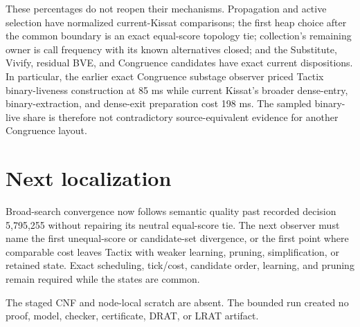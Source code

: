 \documentclass[11pt]{article}
\begin{document}
These percentages do not reopen their mechanisms.  Propagation and active
selection have normalized current-Kissat comparisons; the first heap choice
after the common boundary is an exact equal-score topology tie; collection's
remaining owner is call frequency with its known alternatives closed; and the
Substitute, Vivify, residual BVE, and Congruence candidates have exact current
dispositions.  In particular, the earlier exact Congruence substage observer
priced Tactix binary-liveness construction at 85 ms while current Kissat's
broader dense-entry, binary-extraction, and dense-exit preparation cost 198 ms.
The sampled binary-live share is therefore not contradictory source-equivalent
evidence for another Congruence layout.

\section{Next localization}
Broad-search convergence now follows semantic quality past recorded decision
5,795,255 without repairing its neutral equal-score tie.  The next observer
must name the first unequal-score or candidate-set divergence, or the first
point where comparable cost leaves Tactix with weaker learning, pruning,
simplification, or retained state.  Exact scheduling, tick/cost, candidate
order, learning, and pruning remain required while the states are common.

The staged CNF and node-local scratch are absent.  The bounded run created no
proof, model, checker, certificate, DRAT, or LRAT artifact.
\end{document}
